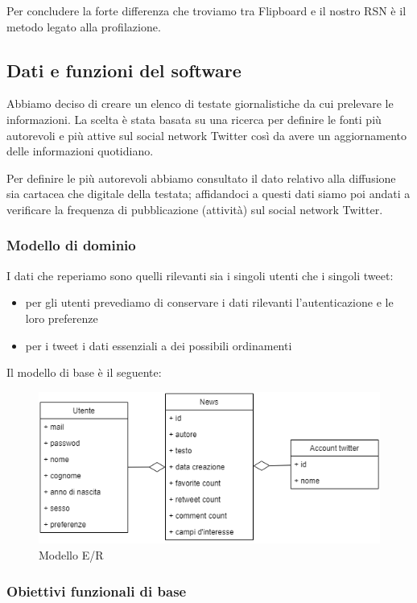 \documentclass[12pt]{article}
\begin{document}
Per concludere la forte differenza che troviamo tra Flipboard e il nostro RSN è il metodo legato alla profilazione.

\subsection{Dati e funzioni del software}

Abbiamo deciso di creare un elenco di testate giornalistiche da cui prelevare le informazioni. La scelta è stata basata su una ricerca per definire le fonti più autorevoli e più attive sul social network Twitter così da avere un aggiornamento delle informazioni quotidiano.

Per definire le più autorevoli abbiamo consultato il dato relativo alla diffusione sia cartacea che digitale della testata; affidandoci a questi dati siamo poi andati a verificare la frequenza di pubblicazione (attività) sul social network Twitter.

\subsubsection{Modello di dominio}

I dati che reperiamo sono quelli rilevanti sia i singoli utenti che i singoli tweet:

\begin{itemize}
\item per gli utenti prevediamo di conservare i dati rilevanti l’autenticazione e le loro preferenze
\item per i tweet i dati essenziali a dei possibili ordinamenti
\end{itemize}

Il modello di base è il seguente:
\begin{figure}[h]
\centering
\includegraphics[height=5cm]{1.png}
\caption{Modello E/R}\label{fig:1}
\end{figure}

\subsubsection{Obiettivi funzionali di base}
\end{document}

